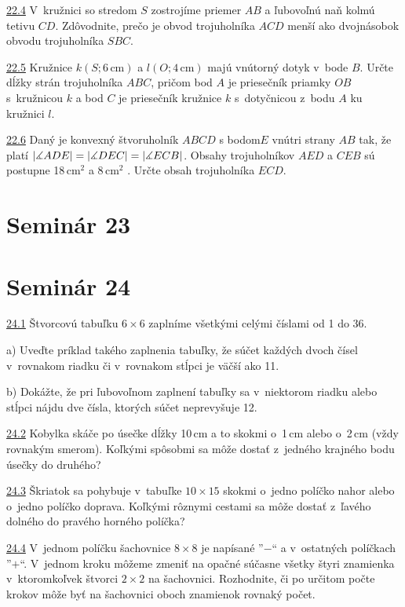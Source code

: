 \noindent \ul{22.4}  V~kružnici so stredom $S$ zostrojíme priemer $AB$ a ľubovoľnú naň kolmú tetivu $CD$. Zdôvodnite, prečo je obvod trojuholníka $ACD$ menší ako dvojnásobok obvodu trojuholníka $SBC$.




\noindent \ul{22.5}  Kružnice $k(S; 6\,\text{cm})$ a $l(O; 4\,\text{cm})$ majú vnútorný dotyk v~bode $B$. Určte dĺžky strán trojuholníka $ABC$, pričom bod $A$ je priesečník priamky $OB$ s~kružnicou $k$ a bod $C$ je priesečník kružnice $k$ s~dotyčnicou z~bodu $A$ ku kružnici $l$.




\noindent  \ul{22.6}   Daný je konvexný štvoruholník $ABCD$ s bodom$E$ vnútri strany $AB$ tak, že platí $|\measuredangle ADE| = |\measuredangle DEC| = |\measuredangle ECB|$. Obsahy trojuholníkov $AED$ a $CEB$ sú postupne 18\,cm$^2$ a 8\,cm$^2$ . Určte obsah trojuholníka $ECD$. 



\section*{Seminár 23}

\section*{Seminár 24}

\noindent \ul{24.1} 
Štvorcovú tabuľku $6\times 6$ zaplníme všetkými celými číslami od 1 do 36.

a) Uveďte príklad takého zaplnenia tabuľky, že súčet každých dvoch čísel v~rovnakom riadku či v~rovnakom stĺpci je väčší ako 11.

b) Dokážte, že pri ľubovoľnom zaplnení tabuľky sa v~niektorom riadku alebo stĺpci nájdu dve čísla, ktorých súčet neprevyšuje 12.




\noindent \ul{24.2} 
Kobylka skáče po úsečke dĺžky 10\,cm a to skokmi o~1\,cm alebo o~2\,cm (vždy rovnakým smerom). Koľkými spôsobmi sa môže dostať z~jedného krajného bodu úsečky do druhého?




\noindent \ul{24.3}  Škriatok sa pohybuje v~tabuľke $10 \times 15$ skokmi o~jedno políčko nahor alebo o~jedno políčko doprava. Koľkými rôznymi cestami sa môže dostať z~ľavého dolného do pravého horného políčka?\




\noindent \ul{24.4}  V~jednom políčku šachovnice $8 \times 8$ je napísané ”$-$“ a v~ostatných políčkach ”$+$“. V~jednom kroku môžeme zmeniť na opačné súčasne všetky štyri znamienka v~ktoromkoľvek štvorci $2 \times 2$ na šachovnici. Rozhodnite, či po určitom počte krokov môže byť na šachovnici oboch znamienok rovnaký počet.




